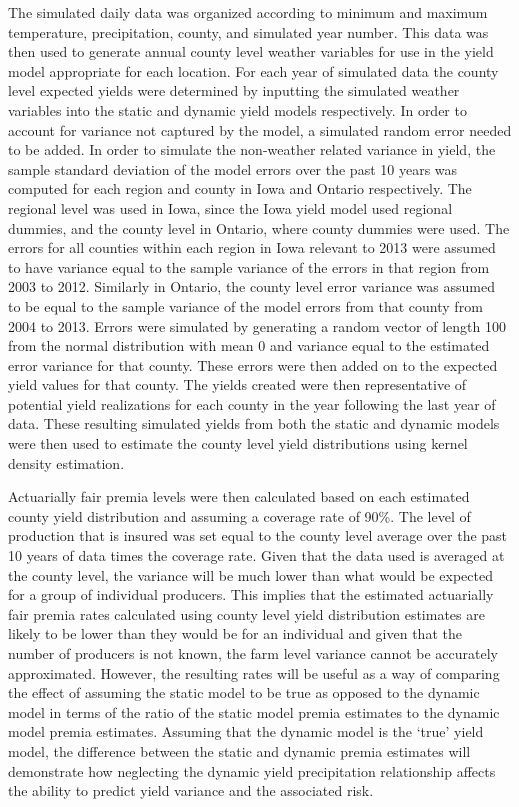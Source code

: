 The simulated daily data was organized according to minimum and maximum temperature, precipitation, county, and simulated year number. This data was then used to generate annual county level weather variables for use in the yield model appropriate for each location. For each year of simulated data the county level expected yields were determined by inputting the simulated weather variables into the static and dynamic yield models respectively. In order to account for variance not captured by the model, a simulated random error needed to be added. In order to simulate the non-weather related variance in yield, the sample standard deviation of the model errors over the past 10 years was computed for each region and county in Iowa and Ontario respectively. The regional level was used in Iowa, since the Iowa yield model used regional dummies, and the county level in Ontario, where county dummies were used. The errors for all counties within each region in Iowa relevant to 2013 were assumed to have variance equal to the sample variance of the errors in that region from 2003 to 2012. Similarly in Ontario, the county level error variance was assumed to be equal to the sample variance of the model errors from that county from 2004 to 2013. Errors were simulated by generating a random vector of length 100 from the normal distribution with mean 0 and variance equal to the estimated error variance for that county. These errors were then added on to the expected yield values for that county. The yields created were then representative of potential yield realizations for each county in the year following the last year of data. These resulting simulated yields from both the static and dynamic models were then used to estimate the county level yield distributions using kernel density estimation. 

Actuarially fair premia levels were then calculated based on each estimated county yield distribution and assuming a coverage rate of 90\%. The level of production that is insured was set equal to the county level average over the past 10 years of data times the coverage rate. Given that the data used is averaged at the county level, the variance will be much lower than what would be expected for a group of individual producers. This implies that the estimated actuarially fair premia rates calculated using county level yield distribution estimates are likely to be lower than they would be for an individual and given that the number of producers is not known, the farm level variance cannot be accurately approximated. However, the resulting rates will be useful as a way of comparing the effect of assuming the static model to be true as opposed to the dynamic model in terms of the ratio of the static model premia estimates to the dynamic model premia estimates. Assuming that the dynamic model is the ‘true’ yield model, the difference between the static and dynamic premia estimates will demonstrate how neglecting the dynamic yield precipitation relationship affects the ability to predict yield variance and the associated risk. 

